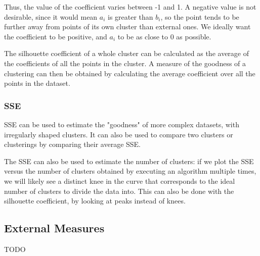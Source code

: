 Thus, the value of the coefficient varies between -1 and 1. A negative value is not desirable, since it would mean $a_i$ is greater than $b_i$, so the point tends to be further away from points of its own cluster than external ones. We ideally want the coefficient to be positive, and $a_i$ to be as close to 0 as possible.

The silhouette coefficient of a whole cluster can be calculated as the average of the coefficients of all the points in the cluster. A measure of the goodness of a clustering can then be obtained by calculating the average coefficient over all the points in the dataset.

\subsubsection{SSE}

SSE can be used to estimate the "goodness" of more complex datasets, with irregularly shaped clusters. It can also be used to compare two clusters or clusterings by comparing their average SSE.

The SSE can also be used to estimate the number of clusters: if we plot the SSE versus the number of clusters obtained by executing an algorithm multiple times, we will likely see a distinct knee in the curve that corresponds to the ideal number of clusters to divide the data into. This can also be done with the silhouette coefficient, by looking at peaks instead of knees.

\subsection{External Measures}

TODO
